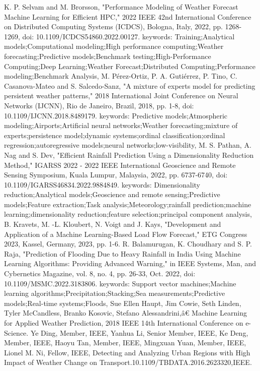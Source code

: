 \documentclass[conference, onecolumn]{IEEEtran}
\begin{document}
\begin{thebibliography}{00}
 K. P. Selvam and M. Brorsson, "Performance Modeling of Weather Forecast Machine Learning for Efficient HPC," 2022 IEEE 42nd International Conference on Distributed Computing Systems (ICDCS), Bologna, Italy, 2022, pp. 1268-1269, doi: 10.1109/ICDCS54860.2022.00127. keywords: {Training;Analytical models;Computational modeling;High performance computing;Weather forecasting;Predictive models;Benchmark testing;High-Performance Computing;Deep Learning;Weather Forecast;Distributed Computing;Performance modeling;Benchmark Analysis},
 M. Pérez-Ortiz, P. A. Gutiérrez, P. Tino, C. Casanova-Mateo and S. Salcedo-Sanz, "A mixture of experts model for predicting persistent weather patterns," 2018 International Joint Conference on Neural Networks (IJCNN), Rio de Janeiro, Brazil, 2018, pp. 1-8, doi: 10.1109/IJCNN.2018.8489179. keywords: {Predictive models;Atmospheric modeling;Airports;Artificial neural networks;Weather forecasting;mixture of experts;persistence model;dynamic systems;ordinal classification;ordinal regression;autoregressive models;neural networks;low-visibility},
 M. S. Pathan, A. Nag and S. Dev, "Efficient Rainfall Prediction Using a Dimensionality Reduction Method," IGARSS 2022 - 2022 IEEE International Geoscience and Remote Sensing Symposium, Kuala Lumpur, Malaysia, 2022, pp. 6737-6740, doi: 10.1109/IGARSS46834.2022.9884849. keywords: {Dimensionality reduction;Analytical models;Geoscience and remote sensing;Predictive models;Feature extraction;Task analysis;Meteorology;rainfall prediction;machine learning;dimensionality reduction;feature selection;principal component analysis},
 B. Kravets, M. -L. Kloubert, N. Voigt and J. Kays, "Development and Application of a Machine Learning-Based Load Flow Forecast," ETG Congress 2023, Kassel, Germany, 2023, pp. 1-6.
 R. Balamurugan, K. Choudhary and S. P. Raja, "Prediction of Flooding Due to Heavy Rainfall in India Using Machine Learning Algorithms: Providing Advanced Warning," in IEEE Systems, Man, and Cybernetics Magazine, vol. 8, no. 4, pp. 26-33, Oct. 2022, doi: 10.1109/MSMC.2022.3183806. keywords: {Support vector machines;Machine learning algorithms;Precipitation;Stacking;Sea measurements;Predictive models;Real-time systems;Floods},
 Sue Ellen Haupt, Jim Cowie, Seth Linden, Tyler McCandless, Branko Kosovic, Stefano Alessandrini,â€ Machine Learning for Applied Weather Prediction, 2018 IEEE 14th International Conference on e-Science.
 Ye Ding, Member, IEEE, Yanhua Li, Senior Member, IEEE, Ke Deng, Member, IEEE, Haoyu Tan, Member, IEEE, Mingxuan Yuan, Member, IEEE, Lionel M. Ni, Fellow, IEEE, Detecting and Analyzing Urban Regions with High Impact of Weather Change on Transport.10.1109/TBDATA.2016.2623320,IEEE.

\end{thebibliography}
\end{document}
